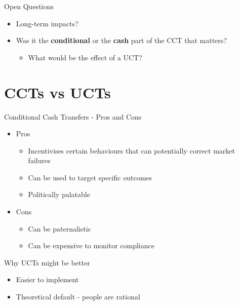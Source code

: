\documentclass[11pt,notes=hide,aspectratio=169,mathserif]{beamer}
\begin{document}
\begin{frame}{Open Questions}
\begin{itemize}
\item Long-term impacts?
\item Was it the \textbf{conditional} or the \textbf{cash} part of the CCT that matters? 
\begin{itemize}
    \pause \item What would be the effect of a UCT?
\end{itemize}
\end{itemize}
\end{frame}

\section*{CCTs vs UCTs}

\begin{frame}{Conditional Cash Transfers - Pros and Cons}
\begin{itemize}
\item Pros
\begin{itemize}
    \pause \item Incentivises certain behaviours that can potentially correct market failures 
    \pause \item Can be used to target specific outcomes 
    \pause \item Politically palatable
\end{itemize}
\item Cons
\begin{itemize}
    \pause \item Can be paternalistic 
    \pause \item Can be expensive to monitor compliance
\end{itemize}
\end{itemize}
\end{frame}

\begin{frame}{Why UCTs might be better}
\begin{itemize}
    \pause \item Easier to implement
    \pause \item Theoretical default - people are rational 
\end{itemize}
\end{frame}
\end{document}
